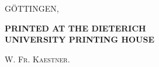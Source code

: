 \clearpage\fancyhead[L]{}

\vspace*{0.24\textheight}
\begin{center}
{\large GÖTTINGEN,}\par
\medskip
\textbf{PRINTED AT THE DIETERICH\\UNIVERSITY PRINTING HOUSE}\par
\smallskip
\textsc{W. Fr. Kaestner.}
\end{center}
\clearpage
\endgroup
